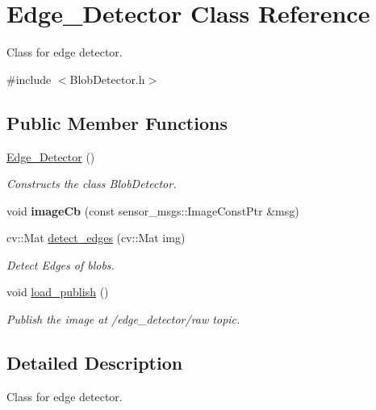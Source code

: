 \hypertarget{classEdge__Detector}{}\section{Edge\+\_\+\+Detector Class Reference}
\label{classEdge__Detector}


Class for edge detector.  




{\ttfamily \#include $<$Blob\+Detector.\+h$>$}

\subsection*{Public Member Functions}
\begin{DoxyCompactItemize}
\item 
\hyperlink{classEdge__Detector_a03735813aa2ea10d31c93d1f9cf34722}{Edge\+\_\+\+Detector} ()
\begin{DoxyCompactList}\small\item\em Constructs the class Blob\+Detector. \end{DoxyCompactList}\item 
void {\bfseries image\+Cb} (const sensor\+\_\+msgs\+::\+Image\+Const\+Ptr \&msg)\hypertarget{classEdge__Detector_ab5145ead4a22363853d91c0eaa9bda9f}{}\label{classEdge__Detector_ab5145ead4a22363853d91c0eaa9bda9f}

\item 
cv\+::\+Mat \hyperlink{classEdge__Detector_acb652b66cb6befd3f5aa61fca5f0c06d}{detect\+\_\+edges} (cv\+::\+Mat img)
\begin{DoxyCompactList}\small\item\em Detect Edges of blobs. \end{DoxyCompactList}\item 
void \hyperlink{classEdge__Detector_ad06b4e96bdab61dfccb08b7a4002ca11}{load\+\_\+publish} ()\hypertarget{classEdge__Detector_ad06b4e96bdab61dfccb08b7a4002ca11}{}\label{classEdge__Detector_ad06b4e96bdab61dfccb08b7a4002ca11}

\begin{DoxyCompactList}\small\item\em Publish the image at /edge\+\_\+detector/raw topic. \end{DoxyCompactList}\end{DoxyCompactItemize}


\subsection{Detailed Description}
Class for edge detector. 

